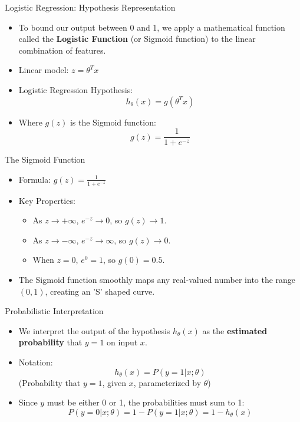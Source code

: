 \documentclass[aspectratio=169]{beamer}
\begin{document}
\begin{frame}{Logistic Regression: Hypothesis Representation}
\begin{itemize}
    \item To bound our output between 0 and 1, we apply a mathematical function called the \textbf{Logistic Function} (or Sigmoid function) to the linear combination of features.
    \item Linear model: $z = \theta^T x$
    \item Logistic Regression Hypothesis: 
    $$ h_\theta(x) = g(\theta^T x) $$
    \item Where $g(z)$ is the Sigmoid function:
    $$ g(z) = \frac{1}{1 + e^{-z}} $$
\end{itemize}
\end{frame}

\begin{frame}{The Sigmoid Function}
\begin{itemize}
    \item Formula: $g(z) = \frac{1}{1 + e^{-z}}$
    \item Key Properties:
    \begin{itemize}
        \item As $z \rightarrow +\infty$, $e^{-z} \rightarrow 0$, so $g(z) \rightarrow 1$.
        \item As $z \rightarrow -\infty$, $e^{-z} \rightarrow \infty$, so $g(z) \rightarrow 0$.
        \item When $z = 0$, $e^{0} = 1$, so $g(0) = 0.5$.
    \end{itemize}
    \item The Sigmoid function smoothly maps any real-valued number into the range $(0, 1)$, creating an 'S' shaped curve.
\end{itemize}
\end{frame}

\begin{frame}{Probabilistic Interpretation}
\begin{itemize}
    \item We interpret the output of the hypothesis $h_\theta(x)$ as the \textbf{estimated probability} that $y=1$ on input $x$.
    \item Notation:
    $$ h_\theta(x) = P(y=1 | x; \theta) $$
    (Probability that $y=1$, given $x$, parameterized by $\theta$)
    \item Since $y$ must be either 0 or 1, the probabilities must sum to 1:
    $$ P(y=0 | x; \theta) = 1 - P(y=1 | x; \theta) = 1 - h_\theta(x) $$
\end{itemize}
\end{frame}
\end{document}
